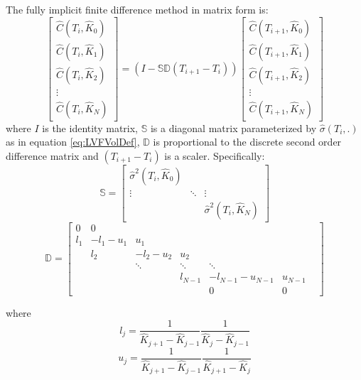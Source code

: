 \documentclass[letterpaper,12pt,titlepage,oneside,final]{book}
\numberwithin{equation}{section}
\theoremstyle{definition}
\begin{document}
The fully implicit finite difference method in matrix form is:
\begin{equation}
	\begin{bmatrix}
\widehat{C}(T_{i},\widehat{K}_0)\\
\widehat{C}(T_{i},\widehat{K}_1)\\
\widehat{C}(T_{i},\widehat{K}_2)\\
\vdots\\
\widehat{C}(T_{i},\widehat{K}_{N})
\end{bmatrix}=(I-\mathcal{\mathbb{S}}\mathcal{\mathbb{D}}(T_{i+1}-T_i))
\begin{bmatrix}
\widehat{C}(T_{i+1},\widehat{K}_0)\\
\widehat{C}(T_{i+1},\widehat{K}_1)\\
\widehat{C}(T_{i+1},\widehat{K}_2)\\
\vdots\\
\widehat{C}(T_{i+1},\widehat{K}_{N})
\end{bmatrix}
\label{eq:LVFInt}
\end{equation}
where 
$I$ is the identity matrix, $\mathcal{\mathbb{S}}$ is a diagonal matrix parameterized by $\widehat{\sigma}(T_i,.)$ as in equation \eqref{eq:LVFVolDef},  $\mathcal{\mathbb{D}}$ is proportional to the discrete second order difference matrix and $(T_{i+1}-T_i)$ is a scaler. Specifically:
		\begin{equation}
			\mathcal{\mathbb{S}}=	\begin{bmatrix}
				\widehat{\sigma}^2(T_i,\widehat{K}_{0})&&\\
				\vdots&\ddots&\vdots\\
				&&\widehat{\sigma}^2(T_i,\widehat{K}_{N})
		\end{bmatrix}
		\label{eq:LVFMatrixS}
		\end{equation}
		\begin{equation}
			\mathcal{\mathbb{D}}=\begin{bmatrix}
		0&0&&&&\\
		l_1&-l_1-u_1&u_1&&&\\
		&l_2&-l_2-u_2&u_2&&&\\
		&&\ddots&\ddots&\ddots&&\\
		&&&l_{N-1}&-l_{N-1}-u_{N-1}&u_{N-1}\\
		&&&&0&0
		\end{bmatrix}
		\label{eq:LVFMatrixD}
		\end{equation}

		where 
		\[l_j=\frac{1}{\widehat{K}_{j+1}-\widehat{K}_{j-1}}\frac{1}{\widehat{K}_{j}-\widehat{K}_{j-1}}\]
		\[u_j=\frac{1}{\widehat{K}_{j+1}-\widehat{K}_{j-1}}\frac{1}{\widehat{K}_{j+1}-\widehat{K}_{j}}\]
\end{document}
